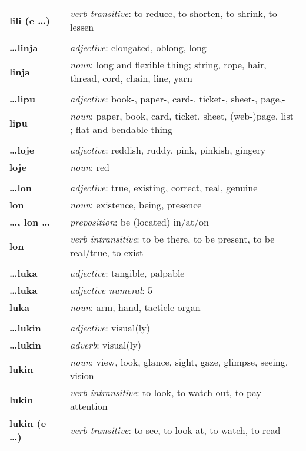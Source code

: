 \begin{supertabular}{p{2,5cm}|ll}
\textbf{lili (e \dots)} && \textit{verb transitive}: to reduce, to shorten, to shrink, to lessen \\ 
 && \\ %
\textbf{\dots linja} && \textit{adjective}: elongated, oblong, long \\ 
\textbf{linja} && \textit{noun}: long and flexible thing; string, rope, hair, thread, cord, chain, line, yarn \\ 
 && \\ %
\textbf{\dots lipu} && \textit{adjective}: book-, paper-, card-, ticket-, sheet-, page,- \\ 
\textbf{lipu} && \textit{noun}: paper, book, card, ticket, sheet, (web-)page, list ; flat and bendable thing \\ 
 && \\ %
\textbf{\dots loje} && \textit{adjective}: reddish, ruddy, pink, pinkish, gingery \\ 
\textbf{loje} && \textit{noun}: red \\ 
 && \\ %
\textbf{\dots lon} && \textit{adjective}: true, existing, correct, real, genuine \\ 
\textbf{lon} && \textit{noun}: existence, being, presence \\ 
\textbf{\dots , lon \dots} && \textit{preposition}: be (located) in/at/on \\ 
\textbf{lon} && \textit{verb intransitive}: to be there, to be present, to be real/true, to exist \\ 
 && \\ %
\textbf{\dots luka} && \textit{adjective}: tangible, palpable \\ 
\textbf{\dots luka} && \textit{adjective numeral}: 5 \\ 
\textbf{luka} && \textit{noun}: arm, hand, tacticle organ \\ 
 && \\ %
\textbf{\dots lukin} && \textit{adjective}: visual(ly) \\ 
\textbf{\dots lukin} && \textit{adverb}: visual(ly) \\ 
\textbf{lukin} && \textit{noun}: view, look, glance, sight, gaze, glimpse, seeing, vision \\ 
\textbf{lukin} && \textit{verb intransitive}: to look, to watch out, to pay attention \\ 
\textbf{lukin (e \dots)} && \textit{verb transitive}: to see, to look at, to watch, to read \\ 

\end{supertabular}
